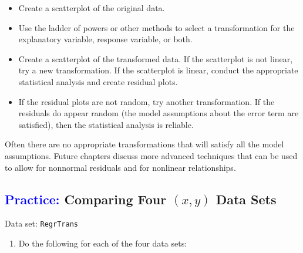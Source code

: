 \documentclass[
]{report}
\providecommand{\tightlist}{%
  \setlength{\itemsep}{0pt}\setlength{\parskip}{0pt}}
\begin{document}
\vspace{-1em}
\begin{itemize}
\item Create a scatterplot of the original data.
\item Use the ladder of powers or other methods to select a transformation for the explanatory variable, response variable, or both.
\item Create a scatterplot of the transformed data. If the scatterplot is not linear, try a new transformation. If the scatterplot is linear, conduct the appropriate statistical analysis and create residual plots.
\item If the residual plots are not random, try another transformation. If the residuals do appear random (the model assumptions about the error term are satisfied), then the statistical analysis is reliable.
\end{itemize}

Often there are no appropriate transformations that will satisfy all the model assumptions. Future chapters discuss more advanced techniques that can be used to allow for nonnormal residuals and for nonlinear relationships.

\hypertarget{comparing-four-scriptstyle-x-y-data-sets}{%
\subsection*{\texorpdfstring{\textcolor{blue}{Practice:} Comparing Four \(\scriptstyle (x, y)\) Data Sets}{ Comparing Four \textbackslash scriptstyle (x, y) Data Sets}}\label{comparing-four-scriptstyle-x-y-data-sets}}

\vspace{-1em}

Data set: \texttt{RegrTrans}

\begin{enumerate}
\def\labelenumi{\arabic{enumi}.}
\setcounter{enumi}{32}
\tightlist
\item
  Do the following for each of the four data sets:\\
  \vspace{-1em}
\end{enumerate}
\end{document}
